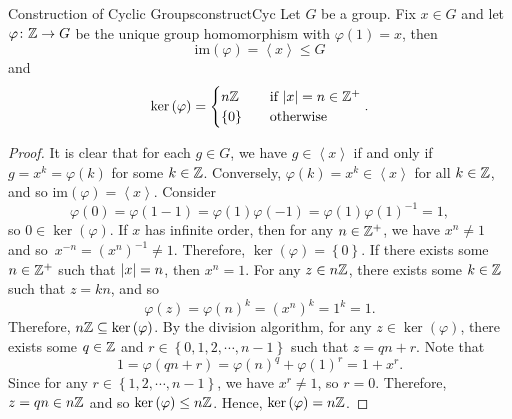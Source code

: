 \documentclass[math]{amznotes}
\theoremstyle{remark}
\newcommand{\cyclic}[1]{\left\langle#1\right\rangle}
\newcommand{\kernel}[1]{\ker\left(#1\right)}
\newcommand{\img}[1]{\mathrm{im}\left(#1\right)}
\newcommand{\0}{\mathbf{0}}
\newcommand{\1}{\mathbf{1}}
\begin{document}
\begin{probox}{Construction of Cyclic Groups}{constructCyc}
    Let $G$ be a group. Fix $x \in G$ and let $\varphi \colon \mathbb{Z} \to G$ be the unique group homomorphism with $\varphi\left(1\right) = x$, then 
    \begin{equation*}
        \img{\varphi} = \left\langle x \right\rangle \leq G
    \end{equation*}
    and 
    \begin{equation*}
        \kernel{\varphi} = \begin{cases}
            n\Z & \quad\textrm{if } \abs{x} = n \in \Z^+ \\
            \left\{0\right\} & \quad\textrm{otherwise}
        \end{cases}.
    \end{equation*}
    \tcblower
    \begin{proof}
        It is clear that for each $g \in G$, we have $g \in \cyclic{x}$ if and only if $g = x^k = \varphi\left(k\right)$ for some $k \in \mathbb{Z}$. Conversely, $\varphi\left(k\right) = x^k \in \cyclic{x}$ for all $k \in \mathbb{Z}$, and so $\img{\varphi} = \cyclic{x}$. Consider 
        \begin{equation*}
            \varphi\left(0\right) = \varphi\left(1 - 1\right) = \varphi\left(1\right)\varphi\left(-1\right) = \varphi\left(1\right)\varphi\left(1\right)^{-1} = 1,
        \end{equation*}
        so $0 \in \kernel{\varphi}$. If $x$ has infinite order, then for any $n \in \mathbb{Z}^+$, we have $x^n \neq 1$ and so~$x^{-n} = \left(x^{n}\right)^{-1}\neq 1$. Therefore, $\kernel{\varphi} = \left\{0\right\}$. If there exists some $n \in \mathbb{Z}^+$ such that ${\left\lvert {x} \right\rvert} = n$, then $x^n = 1$. For any $z \in n\mathbb{Z}$, there exists some $k \in \mathbb{Z}$ such that $z = kn$, and so 
        \begin{equation*}
            \varphi\left(z\right) = \varphi\left(n\right)^k = \left(x^n\right)^k = 1^k = 1.
        \end{equation*}
        Therefore, $n\Z \subseteq \kernel{\varphi}$. By the division algorithm, for any $z \in \kernel{\varphi}$, there exists some $q \in \mathbb{Z}$ and $r \in \left\{0, 1, 2, \cdots, n - 1\right\}$ such that $z = qn + r$. Note that 
        \begin{equation*}
            1 = \varphi\left(qn + r\right) = \varphi\left(n\right)^q + \varphi\left(1\right)^r = 1 + x^r.
        \end{equation*}
        Since for any $r \in \left\{1, 2, \cdots, n - 1\right\}$, we have $x^r \neq 1$, so $r = 0$. Therefore, $z = qn \in n\mathbb{Z}$ and so $\kernel{\varphi} \leq n\Z$. Hence, $\kernel{\varphi} = n\Z$.
    \end{proof}
\end{probox}
\end{document}
